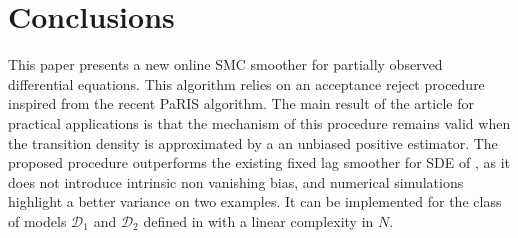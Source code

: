 \documentclass[12pt]{article}
\newcommand{\rmd}{\mathrm{d}}
\newcommand{\eqsp}{\;}
\newcommand{\1}{\mathrm{1}}
\newcommand{\mw}{\mathsf{w}}%
\begin{document}
\section{Conclusions}
This paper presents a new online SMC smoother for partially observed differential equations. This algorithm relies on an acceptance reject procedure inspired from the recent PaRIS algorithm. The main result of the article for practical applications is that the mechanism of this procedure remains valid when the transition density is approximated by a an unbiased positive estimator. The proposed procedure outperforms the existing fixed lag smoother for SDE of \cite{olsson:strojby:2011}, as it does not introduce intrinsic non vanishing bias,  and numerical simulations highlight a better variance on two examples. It can be implemented for the class of models $\mathcal{D}_1$ and $\mathcal{D}_2$ defined in \cite{beskos:papaspiliopoulos:roberts:fearnhead:2006} with a linear complexity in $N$. 
\end{document}
